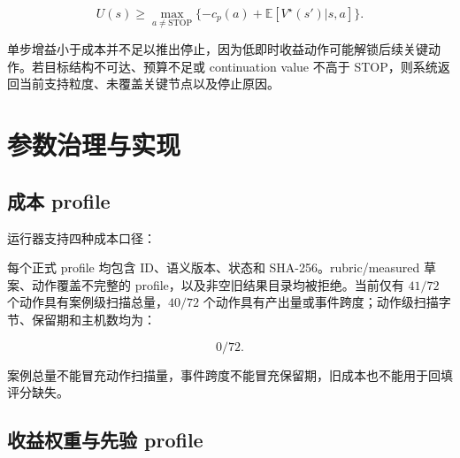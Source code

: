 \documentclass[conference,a4paper,10pt]{IEEEtran}
\begin{document}
\[
U(s)\geq
\max_{a\neq \mathrm{STOP}}
\{-c_p(a)+\mathbb{E}[V^\star(s')|s,a]\}.
\]

单步增益小于成本并不足以推出停止，因为低即时收益动作可能解锁后续关键动作。若目标结构不可达、预算不足或 continuation value 不高于 STOP，则系统返回当前支持粒度、未覆盖关键节点以及停止原因。


\section{参数治理与实现}


\subsection{成本 profile}

运行器支持四种成本口径：

\begin{table}[t]
  \centering
  \caption{成本 profile 的语义、状态与解释边界}
  \label{tab:cost-profiles}
\end{table}

每个正式 profile 均包含 ID、语义版本、状态和 SHA-256。rubric/measured 草案、动作覆盖不完整的 profile，以及非空旧结果目录均被拒绝。当前仅有 \(41/72\) 个动作具有案例级扫描总量，\(40/72\) 个动作具有产出量或事件跨度；动作级扫描字节、保留期和主机数均为：

\[
0/72 .
\]

案例总量不能冒充动作扫描量，事件跨度不能冒充保留期，旧成本也不能用于回填评分缺失。


\subsection{收益权重与先验 profile}
\end{document}
